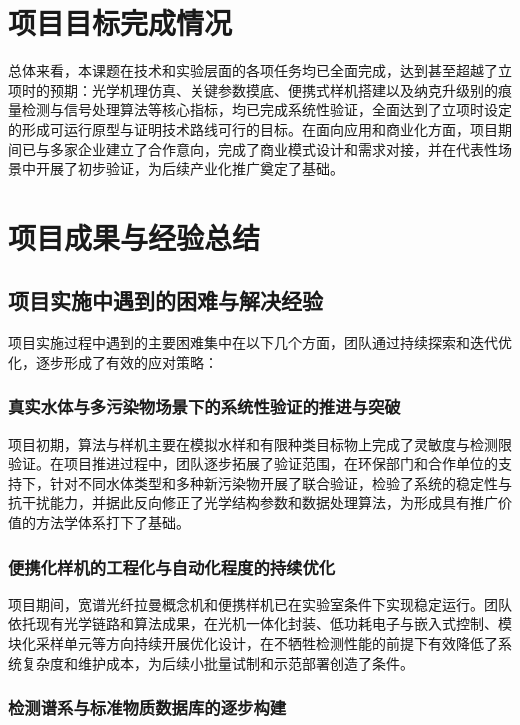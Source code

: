 \documentclass[12pt,a4paper]{article}
\begin{document}
\section{项目目标完成情况}

总体来看，本课题在技术和实验层面的各项任务均已全面完成，达到甚至超越了立项时的预期：光学机理仿真、关键参数摸底、便携式样机搭建以及纳克升级别的痕量检测与信号处理算法等核心指标，均已完成系统性验证，全面达到了立项时设定的形成可运行原型与证明技术路线可行的目标。在面向应用和商业化方面，项目期间已与多家企业建立了合作意向，完成了商业模式设计和需求对接，并在代表性场景中开展了初步验证，为后续产业化推广奠定了基础。

\section{项目成果与经验总结}

\subsection{项目实施中遇到的困难与解决经验}

项目实施过程中遇到的主要困难集中在以下几个方面，团队通过持续探索和迭代优化，逐步形成了有效的应对策略：

\subsubsection{真实水体与多污染物场景下的系统性验证的推进与突破}

项目初期，算法与样机主要在模拟水样和有限种类目标物上完成了灵敏度与检测限验证。在项目推进过程中，团队逐步拓展了验证范围，在环保部门和合作单位的支持下，针对不同水体类型和多种新污染物开展了联合验证，检验了系统的稳定性与抗干扰能力，并据此反向修正了光学结构参数和数据处理算法，为形成具有推广价值的方法学体系打下了基础。

\subsubsection{便携化样机的工程化与自动化程度的持续优化}

项目期间，宽谱光纤拉曼概念机和便携样机已在实验室条件下实现稳定运行。团队依托现有光学链路和算法成果，在光机一体化封装、低功耗电子与嵌入式控制、模块化采样单元等方向持续开展优化设计，在不牺牲检测性能的前提下有效降低了系统复杂度和维护成本，为后续小批量试制和示范部署创造了条件。

\subsubsection{检测谱系与标准物质数据库的逐步构建}
\end{document}
